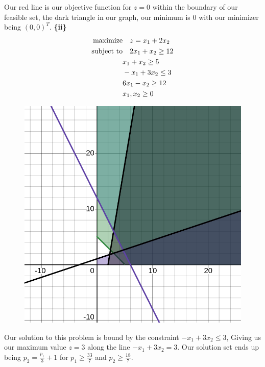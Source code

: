 \documentclass{article}
\begin{document}
Our red line is our objective function for $z = 0$ within the boundary of our feasible set, the dark triangle in our graph, our
minimum is $0$ with our minimizer being $(0,0)^T$. \newline
\textbf{\{ii\}}
    \begin{align*}
        \text{maximize} &\null \quad z = x_1 + 2x_2 \\ 
        \text{subject to} &\null \quad 2x_1 + x_2 \geq 12 \\
        & x_1 + x_2 \geq 5 \\
        & -x_1 + 3x_2 \leq 3 \\
        & 6x_1 - x_2 \geq 12 \\
        & x_1, x_2 \geq 0
    \end{align*}
    \begin{figure}[H]
        \centering
        \includegraphics[scale = 0.35]{1.1(ii).png}
    \end{figure}

Our solution to this problem is bound by the constraint $-x_1 +3x_2 \leq 3$, Giving us our maximum value $z = 3$ along the line $-x_1 + 3x_2 = 3$. Our solution set ends up being  $p_2 = \frac{p_1}{3} + 1$ for $p_1 \geq \frac{33}{7}$ and $p_2 \geq \frac{18}{7}$.
\end{document}
